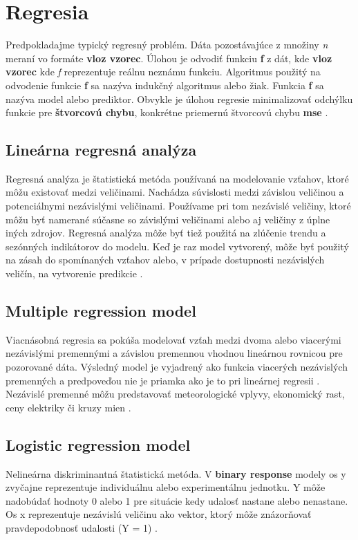 \documentclass[12pt,oneside,slovak,a4paper]{book}
\begin{document}
\section{Regresia}
Predpokladajme typický regresný problém. Dáta pozostávajúce z množiny \textit{n}
meraní vo formáte \textbf{vloz vzorec}. Úlohou je odvodiť funkciu \textbf{f}
z dát, kde \textbf{vloz vzorec}
kde \textit{f} reprezentuje reálnu neznámu funkciu. Algoritmus použitý na
odvodenie funkcie \textbf{f} sa nazýva indukčný algoritmus alebo žiak. Funkcia
\textbf{f} sa nazýva model alebo prediktor. Obvykle je úlohou regresie
minimalizovať odchýlku funkcie pre \textbf{štvorcovú chybu}, konkrétne
priemernú štvorcovú chybu \textbf{mse} \cite{Mendes-Moreira2012}.

\subsection{Lineárna regresná analýza}
Regresná analýza je štatistická metóda používaná na modelovanie vzťahov, ktoré
môžu existovať medzi veličinami. Nachádza súvislosti medzi závislou veličinou
a potenciálnymi nezávislými veličinami. Používame pri tom nezávislé veličiny,
ktoré môžu byť namerané súčasne so závislými veličinami alebo aj veličiny
z úplne iných zdrojov. Regresná analýza môže byť tiež použitá na zlúčenie
trendu a sezónných indikátorov do modelu. Keď je raz model vytvorený,
môže byť použitý na zásah do spomínaných vzťahov alebo, v prípade  dostupnosti
nezávislých veličín, na vytvorenie predikcie \cite{Liu1992}.

\subsection{Multiple regression model}
Viacnásobná regresia sa pokúša modelovať vzťah medzi dvoma alebo viacerými
nezávislými premennými a závislou premennou vhodnou lineárnou rovnicou pre
pozorované dáta. Výsledný model je vyjadrený ako funkcia viacerých nezávislých
premenných a predpoveďou nie je priamka ako je to pri lineárnej
regresii \cite{Grmanova2016}.
Nezávislé premenné môžu predstavovať meteorologické vplyvy, ekonomický rast,
ceny elektriky či kruzy mien \cite{KumarSingh2013}.

\subsection{Logistic regression model}
Nelineárna diskriminantná štatistická metóda. V \textbf{binary response} modely
os y zvyčajne reprezentuje individuálnu alebo experimentálnu jednotku. Y môže
nadobúdať hodnoty 0 alebo 1 pre situácie kedy udalosť nastane alebo nenastane.
Os x reprezentuje nezávislú veličinu ako vektor, ktorý môže znázorňovať
pravdepodobnosť udalosti (Y = 1) \cite{Li2010}.
\end{document}

